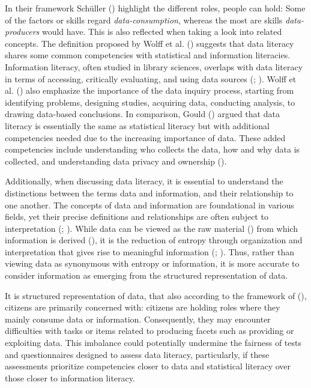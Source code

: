 \documentclass[
  12pt,
  a4paper,
  twoside]{article}
\begin{document}
In their framework Schüller () highlight the different roles, people can hold: Some of the factors or skills regard \emph{data-consumption}, whereas the most are skills \emph{data-producers} would have. This is also reflected when taking a look into related concepts. The definition proposed by Wolff et al. () suggests that data literacy shares some common competencies with statistical and information literacies.\\
Information literacy, often studied in library sciences, overlaps with data literacy in terms of accessing, critically evaluating, and using data sources (; ). Wolff et al. () also emphasize the importance of the data inquiry process, starting from identifying problems, designing studies, acquiring data, conducting analysis, to drawing data-based conclusions. In comparison, Gould () argued that data literacy is essentially the same as statistical literacy but with additional competencies needed due to the increasing importance of data. These added competencies include understanding who collects the data, how and why data is collected, and understanding data privacy and ownership ().

Additionally, when discussing data literacy, it is essential to understand the distinctions between the terms data and information, and their relationship to one another. The concepts of data and information are foundational in various fields, yet their precise definitions and relationships are often subject to interpretation (; ). While data can be viewed as the raw material () from which information is derived (), it is the reduction of entropy through organization and interpretation that gives rise to meaningful information (; ). Thus, rather than viewing data as synonymous with entropy or information, it is more accurate to consider information as emerging from the structured representation of data.

It is structured representation of data, that also according to the framework of (), citizens are primarily concerned with: citizens are holding roles where they mainly consume data or information. Consequently, they may encounter difficulties with tasks or items related to producing facets such as providing or exploiting data. This imbalance could potentially undermine the fairness of tests and questionnaires designed to assess data literacy, particularly, if these assessments prioritize competencies closer to data and statistical literacy over those closer to information literacy.
\end{document}

